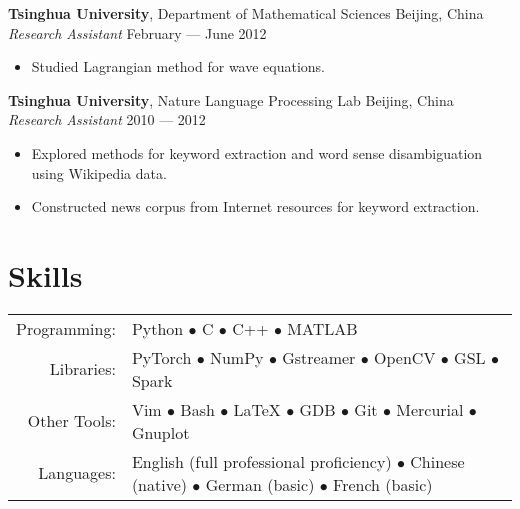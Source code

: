 \documentclass[a4paper,9pt]{extarticle} %
\begin{document}

\textbf{Tsinghua University}, Department of Mathematical Sciences \hfill Beijing, China \\
\textit{Research Assistant} \hfill February --- June 2012
\vspace{-\parskip}
\begin{itemize}
  \item Studied Lagrangian method for wave equations.
\end{itemize}


\textbf{Tsinghua University}, Nature Language Processing Lab \hfill Beijing, China \\
\textit{Research Assistant} \hfill 2010 --- 2012
\vspace{-\parskip}
\begin{itemize}
  \item Explored methods for keyword extraction and word sense disambiguation using Wikipedia data.
  \item Constructed news corpus from Internet resources for keyword extraction.
\end{itemize}

\fi


\section{Skills}

\begin{tabular}{rl}
  Programming: & Python $\bullet$ C $\bullet$ C++ $\bullet$  MATLAB \\
  Libraries: & PyTorch $\bullet$ NumPy $\bullet$ Gstreamer $\bullet$ OpenCV $\bullet$ GSL $\bullet$ Spark \\
  Other Tools: & Vim $\bullet$ Bash $\bullet$ \LaTeX{} $\bullet$ GDB $\bullet$ Git $\bullet$ Mercurial $\bullet$ Gnuplot \\
  Languages: & English (full professional proficiency) $\bullet$ Chinese (native) $\bullet$ German (basic) $\bullet$ French (basic) \\
\end{tabular}
\end{document}
